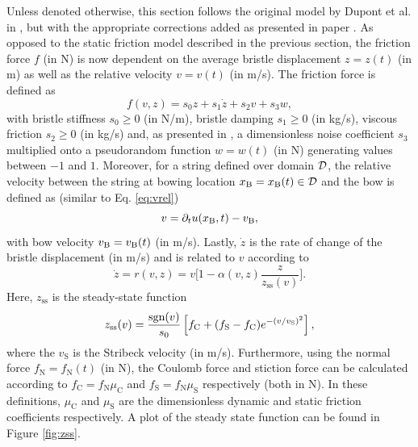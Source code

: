Unless denoted otherwise, this section follows the original model by Dupont et al. in \cite{Dupont2002}, but with the appropriate corrections added as presented in paper \citeP[C]. As opposed to the static friction model described in the previous section, the friction force $f$ (in N) is now dependent on the average bristle displacement $z = z(t)$ (in m) as well as the relative velocity $v = v(t)$ (in m/s). The friction force is defined as
\begin{equation}\label{eq:elastoPlasticForce}
    f(v, z) = s_0z + s_1\dot z + s_2v + s_3w,
\end{equation}
with bristle stiffness $s_0 \geq 0$ (in N/m), bristle damping $s_1 \geq 0$ (in kg/s), viscous friction $s_2 \geq 0$ (in kg/s) and, as presented in \cite{Serafin2004}, a dimensionless noise coefficient $s_3$ multiplied onto a pseudorandom function $w = w(t)$ (in N) generating values between $-1$ and $1$. Moreover, for a string defined over domain $\mathcal{D}$, the relative velocity between the string at bowing location $x_{\text{B}} = x_{\text{B}}(t) \in \mathcal{D}$ and the bow is defined as (similar to Eq. \eqref{eq:vrel})
\begin{equation}\label{eq:vrelElasto}
    v = \partial_t u(x_{\text{B}},t) - v_{\text{B}},
\end{equation}
with bow velocity $v_{\text{B}} = v_{\text{B}}(t)$ (in m/s). Lastly, $\dot z$ is the rate of change of the bristle displacement (in m/s) and is related to $v$ according to
\begin{equation}\label{eq:zdot}
    \dot z = r(v, z) = v \bigg[ 1-  \alpha(v, z)\frac{z}{z_\text{ss}(v)}\bigg].
\end{equation}
Here, $z_\text{ss}$ is the steady-state function
\begin{equation}\label{eq:zss}
    z_\text{ss}(v) = \frac{\text{sgn}(v)}{s_0}\left[f_\text{C}+(f_\text{S}-f_\text{C})e^{-(v/v_\text{S})^2}\right],
\end{equation}
where the $v_\text{S}$ is the Stribeck velocity (in m/s). Furthermore, using the normal force $f_\text{N} = f_\text{N}(t)$ (in N), the Coulomb force and stiction force can be calculated according to $f_\text{C} = f_\text{N}\mu_\text{C}$ and $f_\text{S} = f_\text{N}\mu_\text{S}$ respectively (both in N). In these definitions, $\mu_\text{C}$ and $\mu_\text{S}$ are the dimensionless dynamic and static friction coefficients respectively. A plot of the steady state function can be found in Figure \ref{fig:zss}.

